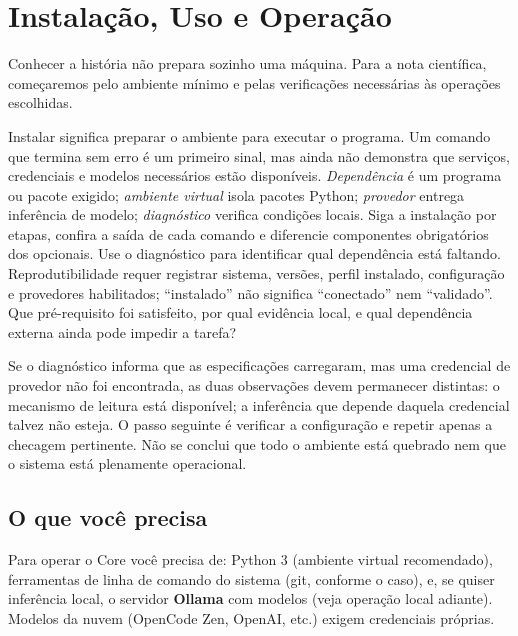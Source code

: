 \chapter{Instalação, Uso e Operação}

Conhecer a história não prepara sozinho uma máquina. Para a nota científica, começaremos pelo ambiente mínimo e pelas verificações necessárias às operações escolhidas.


\roteirodidatico
{Instalar significa preparar o ambiente para executar o programa. Um comando que termina sem erro é um primeiro sinal, mas ainda não demonstra que serviços, credenciais e modelos necessários estão disponíveis.}
{\emph{Dependência} é um programa ou pacote exigido; \emph{ambiente virtual} isola pacotes Python; \emph{provedor} entrega inferência de modelo; \emph{diagnóstico} verifica condições locais.}
{Siga a instalação por etapas, confira a saída de cada comando e diferencie componentes obrigatórios dos opcionais. Use o diagnóstico para identificar qual dependência está faltando.}
{Reprodutibilidade requer registrar sistema, versões, perfil instalado, configuração e provedores habilitados; “instalado” não significa “conectado” nem “validado”.}
{Que pré-requisito foi satisfeito, por qual evidência local, e qual dependência externa ainda pode impedir a tarefa?}

{Se o diagnóstico informa que as especificações carregaram, mas uma credencial de provedor não foi encontrada, as duas observações devem permanecer distintas: o mecanismo de leitura está disponível; a inferência que depende daquela credencial talvez não esteja. O passo seguinte é verificar a configuração e repetir apenas a checagem pertinente. Não se conclui que todo o ambiente está quebrado nem que o sistema está plenamente operacional.}

\section{O que você precisa}


\begin{descricao}
Para operar o Core você precisa de: Python 3 (ambiente virtual recomendado),
ferramentas de linha de comando do sistema (git, conforme o caso), e, se quiser
inferência local, o servidor \textbf{Ollama} com modelos (veja operação local
adiante). Modelos da nuvem (OpenCode Zen, OpenAI, etc.) exigem credenciais
próprias.
\end{descricao}

